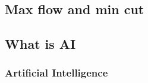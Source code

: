 


\begin{bibunit}

\chapter{Max flow and min cut}
\label{chap:Max-flow-and-min-cut}



% 
% 
\section{What is AI}
\label{intro:sec:what_is_ai}
% 
% 
\subsection{Artificial Intelligence}
\label{sec:artificial_intelligence}



\renewcommand{\bibsection}{\section{\bibname}}
\putbib
\end{bibunit}
